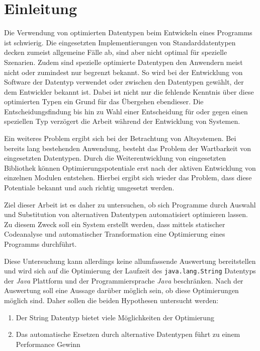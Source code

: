 \chapter{Einleitung}

Die Verwendung von optimierten Datentypen beim Entwickeln eines Programms ist schwierig.
Die eingesetzten Implementierungen von Standarddatentypen decken zumeist allgemeine 
Fälle ab, sind aber nicht optimal für spezielle Szenarien. Zudem sind spezielle
optimierte Datentypen den Anwendern meist nicht oder zumindest nur begrenzt bekannt.
So wird bei der Entwicklung von Software der Datentyp verwendet oder zwischen den 
Datentypen gewählt, der dem Entwickler bekannt ist. Dabei ist nicht nur die fehlende 
Kenntnis über diese optimierten Typen ein Grund für das Übergehen ebendieser. Die 
Entscheidungsfindung bis hin zu Wahl einer Entscheidung für oder gegen einen speziellen
Typ verzögert die Arbeit während der Entwicklung von Systemen. 

Ein weiteres Problem ergibt sich bei der Betrachtung von Altsystemen. Bei bereits 
lang bestehenden Anwendung, besteht das Problem der Wartbarkeit von eingesetzten Datentypen. 
Durch die Weiterentwicklung von eingesetzten Bibliothek können Optimierungspotentiale
erst nach der aktiven Entwicklung von einzelnen Modulen entstehen. Hierbei ergibt sich
wieder das Problem, dass diese Potentiale bekannt und auch richtig umgesetzt werden.

Ziel dieser Arbeit ist es daher zu untersuchen, ob sich Programme durch Auswahl und 
Substitution von alternativen Datentypen automatisiert optimieren lassen. Zu diesem Zweck
soll ein System erstellt werden, dass mittels statischer Codeanalyse und automatischer
Transformation eine Optimierung eines Programms durchführt. 

Diese Untersuchung kann allerdings keine allumfassende Auswertung bereitstellen und wird 
sich auf die Optimierung der Laufzeit des \texttt{java.lang.String} Datentyps der 
\textit{Java} Plattform und der Programmiersprache \textit{Java} beschränken. Nach 
der Auswertung soll eine Aussage darüber möglich sein, ob diese Optimierungen möglich sind.
Daher sollen die beiden Hypothesen untersucht werden:

\begin{enumerate}
	\item Der String Datentyp bietet viele Möglichkeiten der Optimierung
	\item Das automatische Ersetzen durch alternative Datentypen führt zu einem
	Performance Gewinn
\end{enumerate}


